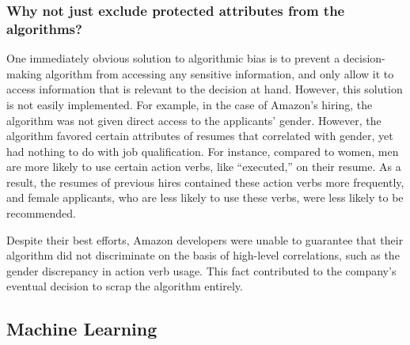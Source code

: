 \subsubsection{Why not just exclude protected attributes from the algorithms?}
\par One immediately obvious solution to algorithmic bias is to prevent a decision-making algorithm from accessing any sensitive information, and only allow it to access information that is relevant to the decision at hand. However, this solution is not easily implemented. For example, in the case of Amazon’s hiring, the algorithm was not given direct access to the applicants’ gender. However, the algorithm favored certain attributes of resumes that correlated with gender, yet had nothing to do with job qualification. For instance, compared to women, men are more likely to use certain action verbs, like “executed,” on their resume. As a result, the resumes of previous hires contained these action verbs more frequently, and female applicants, who are less likely to use these verbs, were less likely to be recommended.

\par Despite their best efforts, Amazon developers were unable to guarantee that their algorithm did not discriminate on the basis of high-level correlations, such as the gender discrepancy in action verb usage. This fact contributed to the company’s eventual decision to scrap the algorithm entirely.

\subsection{Machine Learning}

